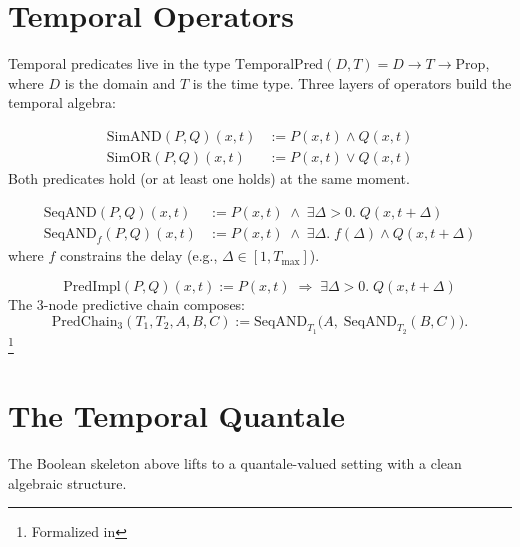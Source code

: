 \documentclass[11pt,openany]{report}
\begin{document}
\section{Temporal Operators}

Temporal predicates live in the type
$\mathrm{TemporalPred}(D, T) = D \to T \to \mathrm{Prop}$,
where $D$ is the domain and $T$ is the time type.  Three layers of
operators build the temporal algebra:

\begin{definition}
\begin{align*}
  \mathrm{SimAND}(P, Q)(x, t) &:= P(x, t) \wedge Q(x, t) \\
  \mathrm{SimOR}(P, Q)(x, t)  &:= P(x, t) \vee Q(x, t)
\end{align*}
Both predicates hold (or at least one holds) at the same moment.
\end{definition}

\begin{definition}
\begin{align*}
  \mathrm{SeqAND}(P, Q)(x, t) &:= P(x, t) \;\wedge\;
    \exists \Delta > 0.\; Q(x, t + \Delta) \\
  \mathrm{SeqAND}_f(P, Q)(x, t) &:= P(x, t) \;\wedge\;
    \exists \Delta.\; f(\Delta) \wedge Q(x, t + \Delta)
\end{align*}
where $f$ constrains the delay (e.g., $\Delta \in [1, T_{\max}]$).
\end{definition}

\begin{definition}
\[
  \mathrm{PredImpl}(P, Q)(x, t) := P(x, t) \;\Rightarrow\;
  \exists \Delta > 0.\; Q(x, t + \Delta)
\]
The 3-node predictive chain composes:
\[
  \mathrm{PredChain}_3(T_1, T_2, A, B, C) :=
  \mathrm{SeqAND}_{T_1}\!\bigl(A,\;
    \mathrm{SeqAND}_{T_2}(B, C)\bigr).
\]%
\footnote{Formalized in
}
\end{definition}


\section{The Temporal Quantale}

The Boolean skeleton above lifts to a quantale-valued setting with
a clean algebraic structure.
\end{document}
